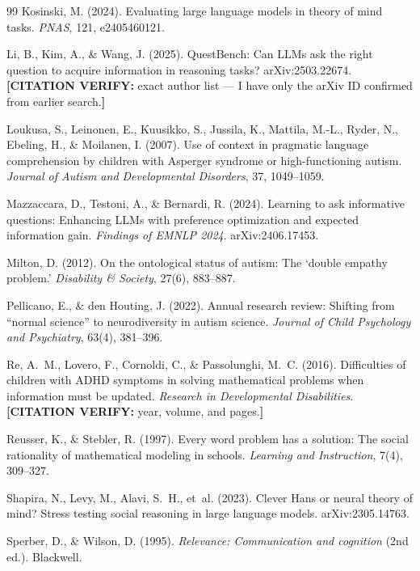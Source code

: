\documentclass[11pt,letterpaper]{article}
\newcommand{\citeverify}[1]{{\color{orange}\textbf{[CITATION VERIFY:} #1\textbf{]}}}
\begin{document}
\begin{thebibliography}{99}
Kosinski, M. (2024). Evaluating large language models in theory of mind tasks. \emph{PNAS}, 121, e2405460121.

Li, B., Kim, A., \& Wang, J. (2025). QuestBench: Can LLMs ask the right question to acquire information in reasoning tasks? arXiv:2503.22674. \citeverify{exact author list --- I have only the arXiv ID confirmed from earlier search.}

Loukusa, S., Leinonen, E., Kuusikko, S., Jussila, K., Mattila, M.-L., Ryder, N., Ebeling, H., \& Moilanen, I. (2007). Use of context in pragmatic language comprehension by children with Asperger syndrome or high-functioning autism. \emph{Journal of Autism and Developmental Disorders}, 37, 1049--1059.

Mazzaccara, D., Testoni, A., \& Bernardi, R. (2024). Learning to ask informative questions: Enhancing LLMs with preference optimization and expected information gain. \emph{Findings of EMNLP 2024}. arXiv:2406.17453.

Milton, D. (2012). On the ontological status of autism: The `double empathy problem.' \emph{Disability \& Society}, 27(6), 883--887.

Pellicano, E., \& den Houting, J. (2022). Annual research review: Shifting from ``normal science'' to neurodiversity in autism science. \emph{Journal of Child Psychology and Psychiatry}, 63(4), 381--396.

Re, A.~M., Lovero, F., Cornoldi, C., \& Passolunghi, M.~C. (2016). Difficulties of children with ADHD symptoms in solving mathematical problems when information must be updated. \emph{Research in Developmental Disabilities}. \citeverify{year, volume, and pages.}

Reusser, K., \& Stebler, R. (1997). Every word problem has a solution: The social rationality of mathematical modeling in schools. \emph{Learning and Instruction}, 7(4), 309--327.

Shapira, N., Levy, M., Alavi, S.~H., et~al. (2023). Clever Hans or neural theory of mind? Stress testing social reasoning in large language models. arXiv:2305.14763.

Sperber, D., \& Wilson, D. (1995). \emph{Relevance: Communication and cognition} (2nd ed.). Blackwell.


\end{thebibliography}
\end{document}
